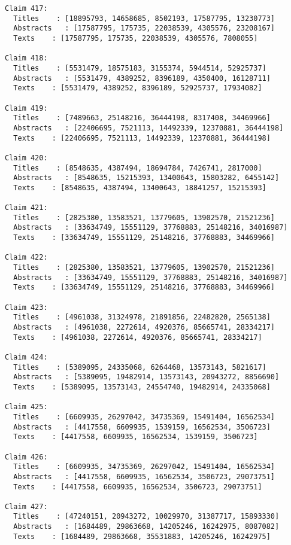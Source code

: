 \documentclass[11pt]{article}
\begin{document}
\begin{Verbatim}[commandchars=\\\{\}]
Claim 417:
  Titles    : [18895793, 14658685, 8502193, 17587795, 13230773]
  Abstracts   : [17587795, 175735, 22038539, 4305576, 23208167]
  Texts    : [17587795, 175735, 22038539, 4305576, 7808055]

Claim 418:
  Titles    : [5531479, 18575183, 3155374, 5944514, 52925737]
  Abstracts   : [5531479, 4389252, 8396189, 4350400, 16128711]
  Texts    : [5531479, 4389252, 8396189, 52925737, 17934082]

Claim 419:
  Titles    : [7489663, 25148216, 36444198, 8317408, 34469966]
  Abstracts   : [22406695, 7521113, 14492339, 12370881, 36444198]
  Texts    : [22406695, 7521113, 14492339, 12370881, 36444198]

Claim 420:
  Titles    : [8548635, 4387494, 18694784, 7426741, 2817000]
  Abstracts   : [8548635, 15215393, 13400643, 15803282, 6455142]
  Texts    : [8548635, 4387494, 13400643, 18841257, 15215393]

Claim 421:
  Titles    : [2825380, 13583521, 13779605, 13902570, 21521236]
  Abstracts   : [33634749, 15551129, 37768883, 25148216, 34016987]
  Texts    : [33634749, 15551129, 25148216, 37768883, 34469966]

Claim 422:
  Titles    : [2825380, 13583521, 13779605, 13902570, 21521236]
  Abstracts   : [33634749, 15551129, 37768883, 25148216, 34016987]
  Texts    : [33634749, 15551129, 25148216, 37768883, 34469966]

Claim 423:
  Titles    : [4961038, 31324978, 21891856, 22482820, 2565138]
  Abstracts   : [4961038, 2272614, 4920376, 85665741, 28334217]
  Texts    : [4961038, 2272614, 4920376, 85665741, 28334217]

Claim 424:
  Titles    : [5389095, 24335068, 6264468, 13573143, 5821617]
  Abstracts   : [5389095, 19482914, 13573143, 20943272, 8856690]
  Texts    : [5389095, 13573143, 24554740, 19482914, 24335068]

Claim 425:
  Titles    : [6609935, 26297042, 34735369, 15491404, 16562534]
  Abstracts   : [4417558, 6609935, 1539159, 16562534, 3506723]
  Texts    : [4417558, 6609935, 16562534, 1539159, 3506723]

Claim 426:
  Titles    : [6609935, 34735369, 26297042, 15491404, 16562534]
  Abstracts   : [4417558, 6609935, 16562534, 3506723, 29073751]
  Texts    : [4417558, 6609935, 16562534, 3506723, 29073751]

Claim 427:
  Titles    : [47240151, 20943272, 10029970, 31387717, 15893330]
  Abstracts   : [1684489, 29863668, 14205246, 16242975, 8087082]
  Texts    : [1684489, 29863668, 35531883, 14205246, 16242975]


\end{Verbatim}
\end{document}
